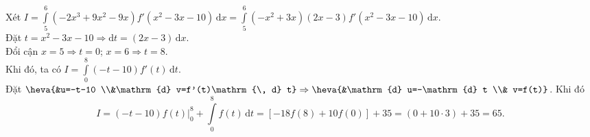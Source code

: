 \begin{ex}
{Xét $I=\int\limits_{5}^{6}\left(-2x^3+9x^2-9x\right) f'\left(x^2-3x-10\right) \mathrm{\, d} x=\int\limits_{5}^{6}\left(-x^2+3x\right)(2x-3)f'\left(x^2-3x-10\right) \mathrm{\, d} x$.\\
Đặt $t=x^2-3x-10 \Rightarrow \mathrm{d} t=(2x-3)\mathrm{\, d} x$.\\
Đổi cận $x=5 \Rightarrow t=0$; $x=6 \Rightarrow t=8$.\\
Khi đó, ta có $I=\int\limits_{0}^{8}(-t-10)f'(t)\mathrm{\, d} t$.\\
Đặt $\heva{&u=-t-10 \\&\mathrm{d} v=f'(t)\mathrm{\, d} t} \Rightarrow \heva{&\mathrm{d} u=-\mathrm{d} t \\& v=f(t)}$. Khi đó
$$ I=(-t-10)f(t)\Bigg|_{0}^{8}+\int\limits_{0}^{8}f(t)\mathrm{\, d} t=\left[-18f(8)+10f(0)\right]+35=(0+10\cdot 3)+35=65. $$
}
\end{ex}

